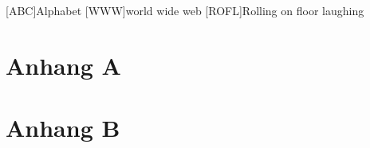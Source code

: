 \documentclass[Master,BMR,english]{BASE/twbook}
\begin{document}
\printbib                                                        %
\clearpage

\listoffigures                                                   %
\clearpage

\listoftables                                                    %
\clearpage

\listoflistings                                                  %
\clearpage

{}
\chapter*{\listacroname}
\begin{acronym}[XXXXX]
    [ABC]{Alphabet}
    [WWW]{world wide web}
    [ROFL]{Rolling on floor laughing}
\end{acronym}
\clearpage
\appendix
\chapter{Anhang A}
\clearpage
\chapter{Anhang B}
\end{document}
